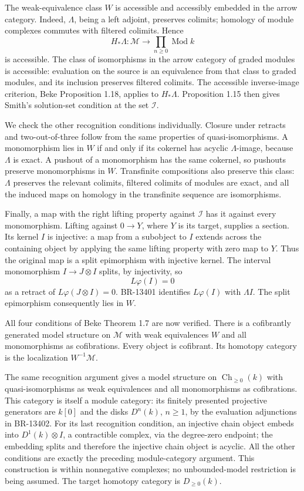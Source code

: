 The weak-equivalence class \(W\) is accessible and accessibly
embedded in the arrow category.  Indeed, \(\Lambda\), being a
left adjoint, preserves colimits; homology of module complexes
commutes with filtered colimits.  Hence
\[
 H_*\Lambda:\mathcal M\longrightarrow
       \prod_{n\ge0}\operatorname{Mod}k
\]
is accessible.  The class of isomorphisms in the arrow category
of graded modules is accessible: evaluation on the source is an
equivalence from that class to graded modules, and its inclusion
preserves filtered colimits.  The accessible inverse-image
criterion, Beke Proposition 1.18, applies to \(H_*\Lambda\).
Proposition 1.15 then gives Smith's solution-set condition at
the set \(\mathcal I\).

We check the other recognition conditions individually.
Closure under retracts and two-out-of-three follow from the
same properties of quasi-isomorphisms.
A monomorphism lies in \(W\) if and only if its cokernel has
acyclic \(\Lambda\)-image, because \(\Lambda\) is exact.
A pushout of a monomorphism has the same cokernel, so pushouts
preserve monomorphisms in \(W\).
Transfinite compositions also preserve this class: \(\Lambda\)
preserves the relevant colimits, filtered colimits of modules
are exact, and all the induced maps on homology in the
transfinite sequence are isomorphisms.

Finally, a map with the right lifting property against
\(\mathcal I\) has it against every monomorphism.
Lifting against \(0\to Y\), where \(Y\) is its target, supplies
a section.  Its kernel \(I\) is injective: a map from a subobject
to \(I\) extends across the containing object by applying the
same lifting property with zero map to \(Y\).
Thus the original map is a split epimorphism with injective
kernel.  The interval monomorphism
\(I\to J\otimes I\) splits, by injectivity, so
\[
 L\varphi(I)=0
\]
as a retract of \(L\varphi(J\otimes I)=0\).
BR-13401 identifies \(L\varphi(I)\) with \(\Lambda I\).
The split epimorphism consequently lies in \(W\).

All four conditions of Beke Theorem 1.7 are now verified.
There is a cofibrantly generated model structure on
\(\mathcal M\) with weak equivalences \(W\) and all monomorphisms
as cofibrations.  Every object is cofibrant.  Its homotopy
category is the localization \(W^{-1}\mathcal M\).

The same recognition argument gives a model structure on
\(\operatorname{Ch}_{\ge0}(k)\) with quasi-isomorphisms as weak
equivalences and all monomorphisms as cofibrations.
This category is itself a module category: its finitely presented
projective generators are \(k[0]\) and the disks \(D^n(k)\),
\(n\ge1\), by the evaluation adjunctions in BR-13402.
For its last recognition condition, an injective chain object
embeds into \(D^1(k)\otimes I\), a contractible complex, via
the degree-zero endpoint; the embedding splits and therefore
the injective chain object is acyclic.  All the other
conditions are exactly the preceding module-category argument.
This construction is within nonnegative complexes; no
unbounded-model restriction is being assumed.
The target homotopy category is \(D_{\ge0}(k)\).


